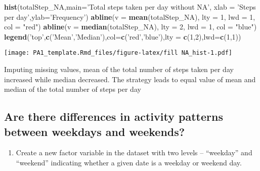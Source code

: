 \documentclass[
]{article}
\newenvironment{Shaded}{\begin{snugshade}}{\end{snugshade}}
\newcommand{\DataTypeTok}[1]{\textcolor[rgb]{0.13,0.29,0.53}{#1}}
\newcommand{\DecValTok}[1]{\textcolor[rgb]{0.00,0.00,0.81}{#1}}
\newcommand{\KeywordTok}[1]{\textcolor[rgb]{0.13,0.29,0.53}{\textbf{#1}}}
\newcommand{\NormalTok}[1]{#1}
\newcommand{\StringTok}[1]{\textcolor[rgb]{0.31,0.60,0.02}{#1}}
\providecommand{\tightlist}{%
  \setlength{\itemsep}{0pt}\setlength{\parskip}{0pt}}
\begin{document}
\begin{Shaded}
\begin{Highlighting}[]
\KeywordTok{hist}\NormalTok{(totalStep_NA,}\DataTypeTok{main=}\StringTok{'Total steps taken per day without NA'}\NormalTok{,}
        \DataTypeTok{xlab =} \StringTok{'Steps per day'}\NormalTok{,}\DataTypeTok{ylab=}\StringTok{'Frequency'}\NormalTok{)}
\KeywordTok{abline}\NormalTok{(}\DataTypeTok{v =} \KeywordTok{mean}\NormalTok{(totalStep_NA), }\DataTypeTok{lty =} \DecValTok{1}\NormalTok{, }\DataTypeTok{lwd =} \DecValTok{1}\NormalTok{, }\DataTypeTok{col =} \StringTok{"red"}\NormalTok{)}
\KeywordTok{abline}\NormalTok{(}\DataTypeTok{v =} \KeywordTok{median}\NormalTok{(totalStep_NA), }\DataTypeTok{lty =} \DecValTok{2}\NormalTok{, }\DataTypeTok{lwd =} \DecValTok{1}\NormalTok{, }\DataTypeTok{col =} \StringTok{"blue"}\NormalTok{)}
\KeywordTok{legend}\NormalTok{(}\StringTok{'top'}\NormalTok{,}\KeywordTok{c}\NormalTok{(}\StringTok{'Mean'}\NormalTok{,}\StringTok{'Median'}\NormalTok{),}\DataTypeTok{col=}\KeywordTok{c}\NormalTok{(}\StringTok{'red'}\NormalTok{,}\StringTok{'blue'}\NormalTok{),}\DataTypeTok{lty =} \KeywordTok{c}\NormalTok{(}\DecValTok{1}\NormalTok{,}\DecValTok{2}\NormalTok{),}\DataTypeTok{lwd=}\KeywordTok{c}\NormalTok{(}\DecValTok{1}\NormalTok{,}\DecValTok{1}\NormalTok{))}
\end{Highlighting}
\end{Shaded}

\texttt{[image: PA1\_template.Rmd\_files/figure-latex/fill NA\_hist-1.pdf]}

Imputing missing values, mean of the total number of steps taken per day
increased while median decreased. The strategy leads to equal value of
mean and median of the total number of steps per day

\hypertarget{are-there-differences-in-activity-patterns-between-weekdays-and-weekends}{%
\subsection{Are there differences in activity patterns between weekdays
and
weekends?}\label{are-there-differences-in-activity-patterns-between-weekdays-and-weekends}}

\begin{enumerate}
\def\labelenumi{\arabic{enumi}.}
\tightlist
\item
  Create a new factor variable in the dataset with two levels --
  ``weekday'' and ``weekend'' indicating whether a given date is a
  weekday or weekend day.
\end{enumerate}
\end{document}
